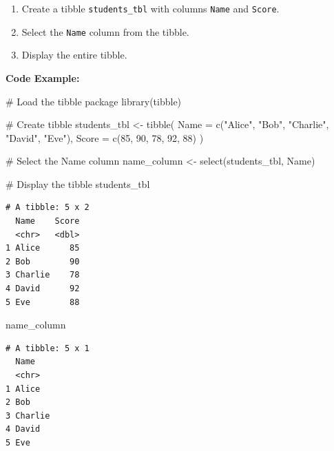 \documentclass[
  letterpaper,
  DIV=11,
  numbers=noendperiod]{scrreprt}
\newenvironment{Shaded}{\begin{snugshade}}{\end{snugshade}}
\newcommand{\AttributeTok}[1]{\textcolor[rgb]{0.40,0.45,0.13}{#1}}
\newcommand{\CommentTok}[1]{\textcolor[rgb]{0.37,0.37,0.37}{#1}}
\newcommand{\DecValTok}[1]{\textcolor[rgb]{0.68,0.00,0.00}{#1}}
\newcommand{\FunctionTok}[1]{\textcolor[rgb]{0.28,0.35,0.67}{#1}}
\newcommand{\NormalTok}[1]{\textcolor[rgb]{0.00,0.23,0.31}{#1}}
\newcommand{\OtherTok}[1]{\textcolor[rgb]{0.00,0.23,0.31}{#1}}
\newcommand{\StringTok}[1]{\textcolor[rgb]{0.13,0.47,0.30}{#1}}
\providecommand{\tightlist}{%
  \setlength{\itemsep}{0pt}\setlength{\parskip}{0pt}}\usepackage{longtable,booktabs,array}
\begin{document}
\begin{enumerate}
\def\labelenumi{\arabic{enumi}.}
\tightlist
\item
  Create a tibble \texttt{students\_tbl} with columns \texttt{Name} and
  \texttt{Score}.
\item
  Select the \texttt{Name} column from the tibble.
\item
  Display the entire tibble.
\end{enumerate}

\textbf{Code Example:}

\begin{Shaded}
\begin{Highlighting}[]
\CommentTok{\# Load the tibble package}
\FunctionTok{library}\NormalTok{(tibble)}

\CommentTok{\# Create tibble}
\NormalTok{students\_tbl }\OtherTok{\textless{}{-}} \FunctionTok{tibble}\NormalTok{(}
  \AttributeTok{Name =} \FunctionTok{c}\NormalTok{(}\StringTok{"Alice"}\NormalTok{, }\StringTok{"Bob"}\NormalTok{, }\StringTok{"Charlie"}\NormalTok{, }\StringTok{"David"}\NormalTok{, }\StringTok{"Eve"}\NormalTok{),}
  \AttributeTok{Score =} \FunctionTok{c}\NormalTok{(}\DecValTok{85}\NormalTok{, }\DecValTok{90}\NormalTok{, }\DecValTok{78}\NormalTok{, }\DecValTok{92}\NormalTok{, }\DecValTok{88}\NormalTok{)}
\NormalTok{)}

\CommentTok{\# Select the Name column}
\NormalTok{name\_column }\OtherTok{\textless{}{-}} \FunctionTok{select}\NormalTok{(students\_tbl, Name)}

\CommentTok{\# Display the tibble}
\NormalTok{students\_tbl}
\end{Highlighting}
\end{Shaded}

\begin{verbatim}
# A tibble: 5 x 2
  Name    Score
  <chr>   <dbl>
1 Alice      85
2 Bob        90
3 Charlie    78
4 David      92
5 Eve        88
\end{verbatim}

\begin{Shaded}
\begin{Highlighting}[]
\NormalTok{name\_column}
\end{Highlighting}
\end{Shaded}

\begin{verbatim}
# A tibble: 5 x 1
  Name   
  <chr>  
1 Alice  
2 Bob    
3 Charlie
4 David  
5 Eve    
\end{verbatim}
\end{document}
